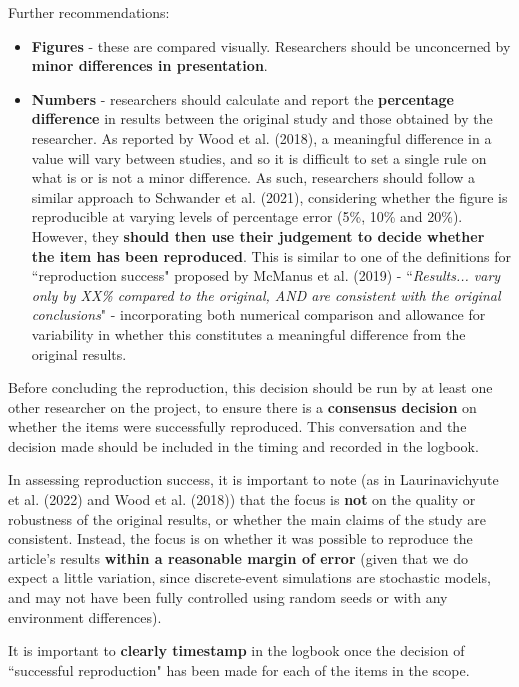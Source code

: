 Further recommendations:
\begin{itemize}
    \item \textbf{Figures} - these are compared visually. Researchers should be unconcerned by \textbf{minor differences in presentation}.
    \item \textbf{Numbers} - researchers should calculate and report the \textbf{percentage difference} in results between the original study and those obtained by the researcher. As reported by Wood et al. (2018),\autocite{wood_push_2018, wood_replication_2018} a meaningful difference in a value will vary between studies, and so it is difficult to set a single rule on what is or is not a minor difference. As such, researchers should follow a similar approach to Schwander et al. (2021),\autocite{schwander_replication_2021} considering whether the figure is reproducible at varying levels of percentage error (5\%, 10\% and 20\%). However, they \textbf{should then use their judgement to decide whether the item has been reproduced}. This is similar to one of the definitions for ``reproduction success" proposed by McManus et al. (2019)\autocite{mcmanus_can_2019} - ``\textit{Results... vary only by XX\% compared to the original, AND are consistent with the original conclusions}" - incorporating both numerical comparison and allowance for variability in whether this constitutes a meaningful difference from the original results.
\end{itemize}

Before concluding the reproduction, this decision should be run by at least one other researcher on the project, to ensure there is a \textbf{consensus decision} on whether the items were successfully reproduced. This conversation and the decision made should be included in the timing and recorded in the logbook.

In assessing reproduction success, it is important to note (as in Laurinavichyute et al. (2022)\autocite{laurinavichyute_share_2022} and Wood et al. (2018)\autocite{wood_push_2018}) that the focus is \textbf{not} on the quality or robustness of the original results, or whether the main claims of the study are consistent. Instead, the focus is on whether it was possible to reproduce the article's results \textbf{within a reasonable margin of error} (given that we do expect a little variation, since discrete-event simulations are stochastic models, and may not have been fully controlled using random seeds or with any environment differences).

It is important to \textbf{clearly timestamp} in the logbook once the decision of ``successful reproduction" has been made for each of the items in the scope.

